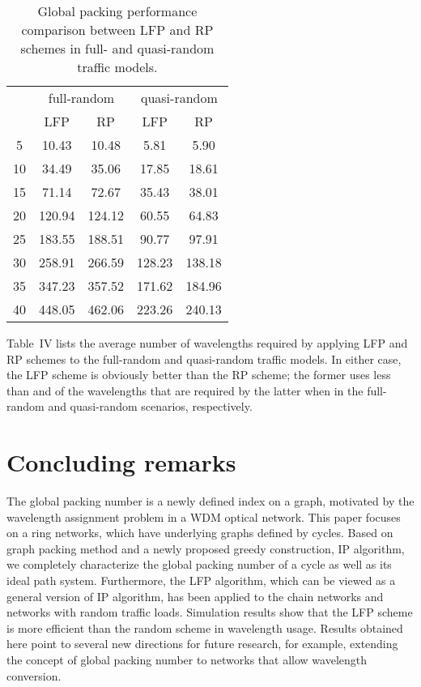 \documentclass[journal,draftcls,onecolumn,12pt,twoside]{IEEEtran}
\begin{document}
\begin{table}[h]\label{tab:random}
\begin{tabular}{|c||c|c||c|c|}
\hline
\multirow{2}{*}{} &
\multicolumn{2}{c||}{full-random} &
\multicolumn{2}{c|}{quasi-random} \\
\cline{2-5}
  & LFP & RP & LFP & RP \\
\hline \hline
5 & 10.43 & 10.48 & 5.81 & 5.90 \\
\hline
10 & 34.49 & 35.06 & 17.85 & 18.61 \\
\hline
15 & 71.14 & 72.67 & 35.43 & 38.01 \\
\hline
20 & 120.94 & 124.12 & 60.55 & 64.83 \\
\hline
25 & 183.55 & 188.51 & 90.77 & 97.91 \\
\hline
30 & 258.91 & 266.59 & 128.23 & 138.18 \\
\hline
35 & 347.23 & 357.52 & 171.62 & 184.96 \\
\hline
40 & 448.05 & 462.06 & 223.26 & 240.13 \\
\hline
\end{tabular}
\caption{Global packing performance comparison between LFP and RP schemes in full- and quasi-random traffic models.}
\end{table}

Table~IV lists the average number of wavelengths required by applying LFP and RP schemes to the full-random and quasi-random traffic models.
In either case, the LFP scheme is obviously better than the RP scheme; the former uses less than  and  of the wavelengths that are required by the latter when  in the full-random and quasi-random scenarios, respectively.

\medskip



\section{Concluding remarks}\label{sec:conclusion}
The global packing number is a newly defined index on a graph, motivated by
the wavelength assignment problem in a WDM optical network.
This paper focuses on a ring networks, which have underlying graphs defined by cycles.
Based on graph packing method and a newly proposed greedy construction, IP algorithm, we completely characterize the global packing number of a cycle as well as its ideal path system.
Furthermore, the LFP algorithm, which can be viewed as a general version of IP algorithm, has been applied to the chain networks and networks with random traffic loads.
Simulation results show that the LFP scheme is more efficient than the random scheme in wavelength usage.  Results obtained here point to several new directions for future research,
for example, extending the concept of global packing number to networks that allow
wavelength conversion. 
\end{document}
